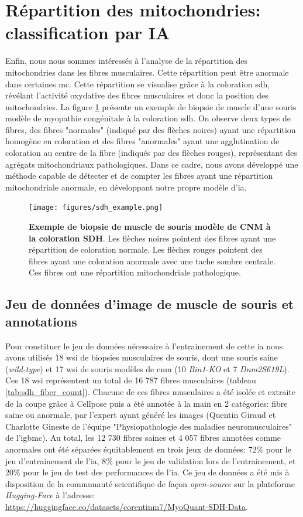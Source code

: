 \section{Répartition des mitochondries: classification par IA}
Enfin, nous nous sommes intéressés à l'analyse de la répartition des mitochondries dans les fibres musculaires. Cette répartition peut être anormale dans certaines \gls{mc}. Cette répartition se visualise grâce à la coloration \gls{sdh}, révélant l'activité oxydative des fibres musculaires et donc la position des mitochondries. La figure \ref{fig:sdh_example} présente un exemple de biopsie de muscle d'une souris modèle de myopathie congénitale à la coloration \gls{sdh}. On observe deux types de fibres, des fibres "normales" (indiqué par des flèches noires) ayant une répartition homogène en coloration et des fibres "anormales" ayant une agglutination de coloration au centre de la fibre (indiqués par des flèches rouges), représentant des agrégats mitochondriaux pathologiques. Dans ce cadre, nous avons développé une méthode capable de détecter et de compter les fibres ayant une répartition mitochondriale anormale, en développant notre propre modèle d'\gls{ia}.

\begin{figure}[!ht]
 \centering
 \texttt{[image: figures/sdh\_example.png]}
 \caption[Exemple de biopsie musculaire à la coloration SDH]{\textbf{Exemple de biopsie de muscle de souris modèle de CNM à la coloration SDH}. Les flèches noires pointent des fibres ayant une répartition de coloration normale. Les flèches rouges pointent des fibres ayant une coloration anormale avec une tache sombre centrale. Ces fibres ont une répartition mitochondriale pathologique.}
 \label{fig:sdh_example}
\end{figure}
\subsection{Jeu de données d'image de muscle de souris et annotations}
Pour constituer le jeu de données nécessaire à l'entrainement de cette \gls{ia} nous avons utilisés 18 \gls{wsi} de biopsies musculaires de souris, dont une souris saine (\textit{wild-type}) et 17 \gls{wsi} de souris modèles de \gls{cnm} (10 \textit{Bin1-KO} et 7 \textit{Dnm2S619L}). Ces 18 \gls{wsi} représentent un total de 16 787 fibres musculaires (tableau \ref{tab:sdh_fiber_count}). Chacune de ces fibres musculaires a été isolée et extraite de la coupe grâce à Cellpose puis a été annotée à la main en 2 catégories: fibre saine ou anormale, par l'expert ayant généré les images (Quentin Giraud et Charlotte Gineste de l'équipe "Physiopathologie des maladies neuromusculaires" de l'\gls{igbmc}). Au total, les 12 730 fibres saines et 4 057 fibres annotées comme anormales ont été séparées équitablement en trois jeux de données: 72\% pour le jeu d'entrainement de l'\gls{ia}, 8\% pour le jeu de validation lors de l'entrainement, et 20\% pour le jeu de test des performances de l'\gls{ia}. Ce jeu de données a été mis à disposition de la communauté scientifique de façon \textit{open-source} sur la plateforme \textit{Hugging-Face} à l'adresse: \href{https://huggingface.co/datasets/corentinm7/MyoQuant-SDH-Data}{https://huggingface.co/datasets/corentinm7/MyoQuant-SDH-Data}.

